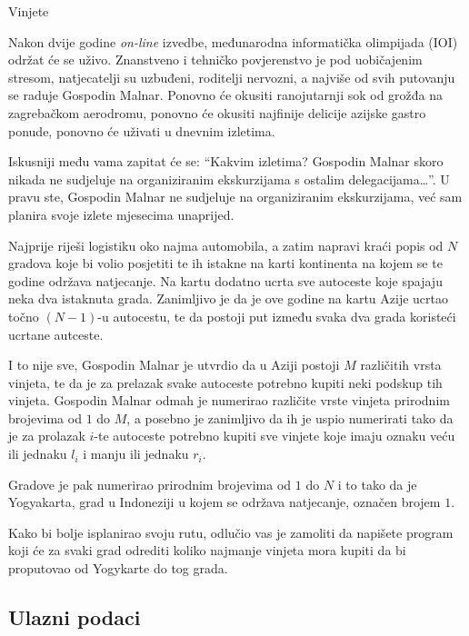\begin{statement}[
  problempoints=100,
  timelimit=1 sekunda,
  memorylimit=512 MiB,
]{Vinjete}

Nakon dvije godine \textit{on-line} izvedbe, međunarodna informatička
olimpijada (IOI) održat će se uživo. Znanstveno i tehničko povjerenstvo je
pod uobičajenim stresom, natjecatelji su uzbuđeni, roditelji nervozni, a
najviše od svih putovanju se raduje Gospodin Malnar. Ponovno će okusiti
ranojutarnji sok od grožđa na zagrebačkom aerodromu, ponovno će okusiti
najfinije delicije azijske gastro ponude, ponovno će uživati u dnevnim
izletima.

Iskusniji među vama zapitat će se: ``Kakvim izletima? Gospodin Malnar skoro
nikada ne sudjeluje na organiziranim ekskurzijama s ostalim delegacijama\ldots''.
U pravu ste, Gospodin Malnar ne sudjeluje na organiziranim ekskurzijama, već sam
planira svoje izlete mjesecima unaprijed.

Najprije riješi logistiku oko najma automobila, a zatim napravi kraći popis od
$N$ gradova koje bi volio posjetiti te ih istakne na karti kontinenta na
kojem se te godine održava natjecanje. Na kartu dodatno ucrta sve autoceste
koje spajaju neka dva istaknuta grada. Zanimljivo je da je ove godine na
kartu Azije ucrtao točno $(N-1)$-u autocestu, te da postoji put između svaka
dva grada koristeći ucrtane autceste.

I to nije sve, Gospodin Malnar je utvrdio da u Aziji postoji $M$ različitih
vrsta vinjeta, te da je za prelazak svake autoceste potrebno kupiti neki
podskup tih vinjeta. Gospodin Malnar odmah je numerirao različite vrste
vinjeta prirodnim brojevima od $1$ do $M$, a posebno je zanimljivo da ih je
uspio numerirati tako da je za prolazak $i$-te autoceste potrebno kupiti sve
vinjete koje imaju oznaku veću ili jednaku $l_i$ i manju ili jednaku $r_i$.

Gradove je pak numerirao prirodnim brojevima od $1$ do $N$ i to tako da je
Yogyakarta, grad u Indoneziji u kojem se održava natjecanje, označen brojem $1$.

Kako bi bolje isplanirao svoju rutu, odlučio vas je zamoliti da napišete program
koji će za svaki grad odrediti koliko najmanje vinjeta mora kupiti da bi
proputovao od Yogykarte do tog grada.
\subsection*{Ulazni podaci}


\end{statement}
